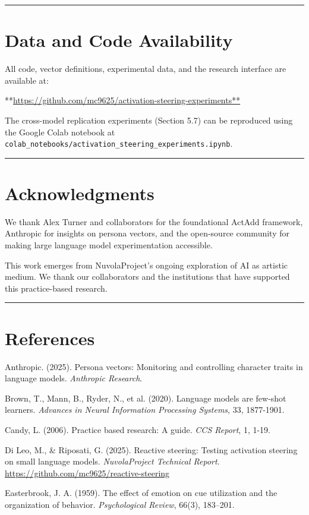 \documentclass[11pt,a4paper]{article}
\begin{document}
\bigskip\hrule\bigskip

\section*{Data and Code Availability}

All code, vector definitions, experimental data, and the research interface are available at:

**\url{https://github.com/mc9625/activation-steering-experiments**}

The cross-model replication experiments (Section 5.7) can be reproduced using the Google Colab notebook at \texttt{colab\_notebooks/activation\_steering\_experiments.ipynb}.

\bigskip\hrule\bigskip

\section*{Acknowledgments}

We thank Alex Turner and collaborators for the foundational ActAdd framework, Anthropic for insights on persona vectors, and the open-source community for making large language model experimentation accessible.

This work emerges from NuvolaProject's ongoing exploration of AI as artistic medium. We thank our collaborators and the institutions that have supported this practice-based research.

\bigskip\hrule\bigskip

\section*{References}

Anthropic. (2025). Persona vectors: Monitoring and controlling character traits in language models. \emph{Anthropic Research}.

Brown, T., Mann, B., Ryder, N., et al. (2020). Language models are few-shot learners. \emph{Advances in Neural Information Processing Systems}, 33, 1877-1901.

Candy, L. (2006). Practice based research: A guide. \emph{CCS Report}, 1, 1-19.

Di Leo, M., \& Riposati, G. (2025). Reactive steering: Testing activation steering on small language models. \emph{NuvolaProject Technical Report}. \url{https://github.com/mc9625/reactive-steering}

Easterbrook, J. A. (1959). The effect of emotion on cue utilization and the organization of behavior. \emph{Psychological Review}, 66(3), 183--201.
\end{document}
